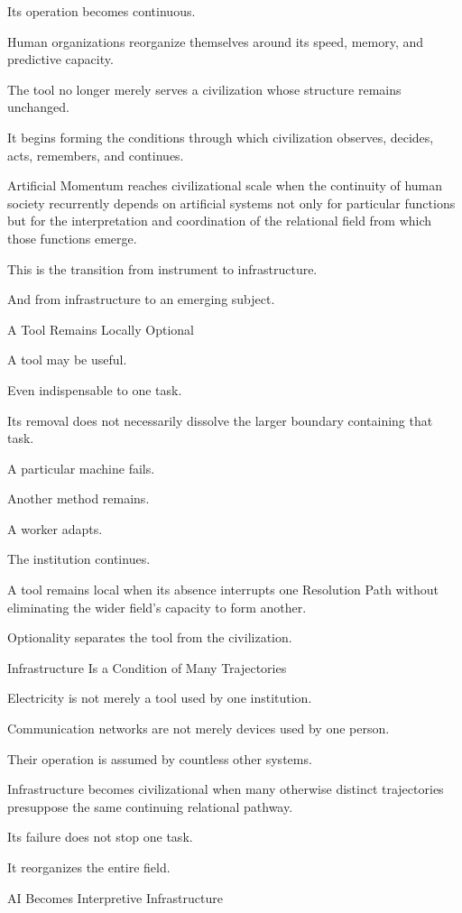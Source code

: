 Its operation becomes continuous.

Human organizations reorganize themselves around its speed, memory, and predictive capacity.

The tool no longer merely serves a civilization whose structure remains unchanged.

It begins forming the conditions through which civilization observes, decides, acts, remembers, and continues.

Artificial Momentum reaches civilizational scale when the continuity of human society recurrently depends on artificial systems not only for particular functions but for the interpretation and coordination of the relational field from which those functions emerge.

This is the transition from instrument to infrastructure.

And from infrastructure to an emerging subject.

A Tool Remains Locally Optional

A tool may be useful.

Even indispensable to one task.

Its removal does not necessarily dissolve the larger boundary containing that task.

A particular machine fails.

Another method remains.

A worker adapts.

The institution continues.

A tool remains local when its absence interrupts one Resolution Path without eliminating the wider field’s capacity to form another.

Optionality separates the tool from the civilization.

Infrastructure Is a Condition of Many Trajectories

Electricity is not merely a tool used by one institution.

Communication networks are not merely devices used by one person.

Their operation is assumed by countless other systems.

Infrastructure becomes civilizational when many otherwise distinct trajectories presuppose the same continuing relational pathway.

Its failure does not stop one task.

It reorganizes the entire field.

AI Becomes Interpretive Infrastructure

